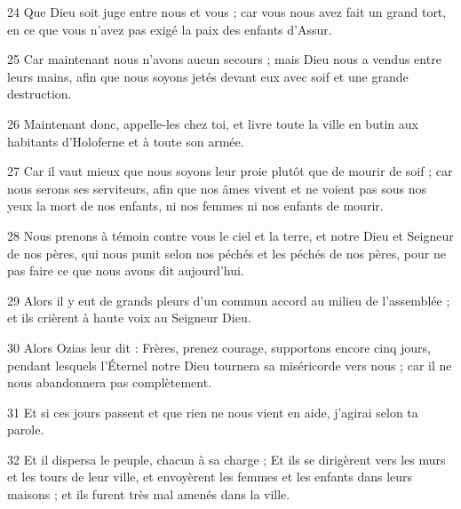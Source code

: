 \par 24 Que Dieu soit juge entre nous et vous ; car vous nous avez fait un grand tort, en ce que vous n'avez pas exigé la paix des enfants d'Assur.
\par 25 Car maintenant nous n'avons aucun secours ; mais Dieu nous a vendus entre leurs mains, afin que nous soyons jetés devant eux avec soif et une grande destruction.
\par 26 Maintenant donc, appelle-les chez toi, et livre toute la ville en butin aux habitants d'Holoferne et à toute son armée.
\par 27 Car il vaut mieux que nous soyons leur proie plutôt que de mourir de soif ; car nous serons ses serviteurs, afin que nos âmes vivent et ne voient pas sous nos yeux la mort de nos enfants, ni nos femmes ni nos enfants de mourir.
\par 28 Nous prenons à témoin contre vous le ciel et la terre, et notre Dieu et Seigneur de nos pères, qui nous punit selon nos péchés et les péchés de nos pères, pour ne pas faire ce que nous avons dit aujourd'hui.
\par 29 Alors il y eut de grands pleurs d'un commun accord au milieu de l'assemblée ; et ils crièrent à haute voix au Seigneur Dieu.
\par 30 Alors Ozias leur dit : Frères, prenez courage, supportons encore cinq jours, pendant lesquels l'Éternel notre Dieu tournera sa miséricorde vers nous ; car il ne nous abandonnera pas complètement.
\par 31 Et si ces jours passent et que rien ne nous vient en aide, j'agirai selon ta parole.
\par 32 Et il dispersa le peuple, chacun à sa charge ; Et ils se dirigèrent vers les murs et les tours de leur ville, et envoyèrent les femmes et les enfants dans leurs maisons ; et ils furent très mal amenés dans la ville.


